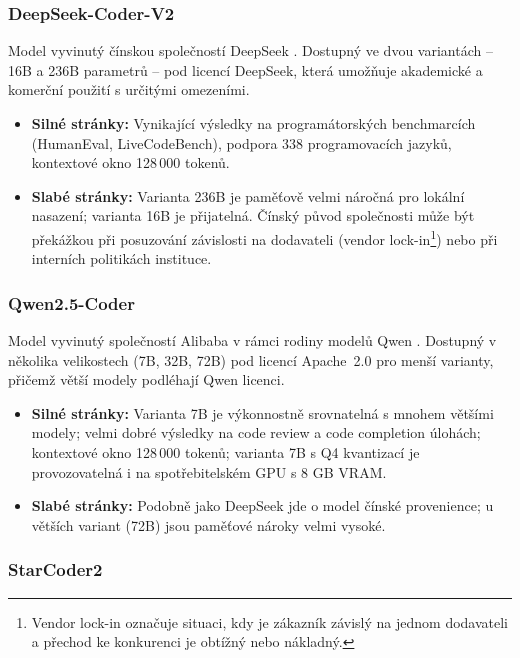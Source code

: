 \subsubsection*{DeepSeek-Coder-V2}

Model vyvinutý čínskou společností DeepSeek \cite{deepseekcoder2024}.
Dostupný ve dvou variantách -- 16B a 236B parametrů -- pod licencí DeepSeek, která umožňuje akademické a komerční použití s určitými omezeními.

\begin{itemize}
    \item \textbf{Silné stránky:} Vynikající výsledky na programátorských benchmarcích (HumanEval, LiveCodeBench), podpora 338 programovacích jazyků, kontextové okno 128\,000 tokenů.
    \item \textbf{Slabé stránky:} Varianta 236B je paměťově velmi náročná pro lokální nasazení; varianta 16B je přijatelná. Čínský původ společnosti může být překážkou při posuzování závislosti na dodavateli (vendor lock-in\footnote{Vendor lock-in označuje situaci, kdy je zákazník závislý na jednom dodavateli a přechod ke konkurenci je obtížný nebo nákladný.}) nebo při interních politikách instituce.
\end{itemize}

\subsubsection*{Qwen2.5-Coder}

Model vyvinutý společností Alibaba v rámci rodiny modelů Qwen \cite{qwen25coder2024}.
Dostupný v několika velikostech (7B, 32B, 72B) pod licencí Apache~2.0 pro menší varianty, přičemž větší modely podléhají Qwen licenci.

\begin{itemize}
    \item \textbf{Silné stránky:} Varianta 7B je výkonnostně srovnatelná s mnohem většími modely; velmi dobré výsledky na code review a code completion úlohách; kontextové okno 128\,000 tokenů; varianta 7B s Q4 kvantizací je provozovatelná i na spotřebitelském GPU s 8 GB VRAM.
    \item \textbf{Slabé stránky:} Podobně jako DeepSeek jde o model čínské provenience; u větších variant (72B) jsou paměťové nároky velmi vysoké.
\end{itemize}

\subsubsection*{StarCoder2}

